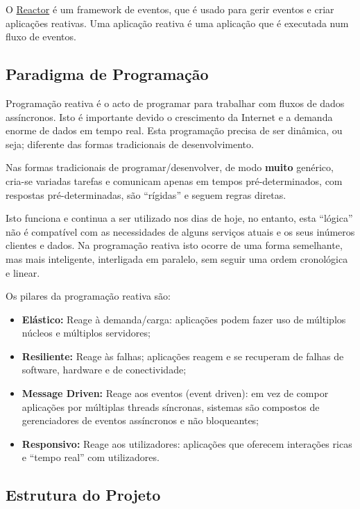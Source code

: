 O \href{https://projectreactor.io/}{Reactor} é um framework de eventos, que é usado para gerir eventos e criar aplicações reativas. Uma aplicação reativa é uma aplicação que é executada num fluxo de eventos.\cite{reactor}

\subsection{Paradigma de Programação}

Programação reativa é o acto de programar para trabalhar com fluxos de dados assíncronos. Isto é importante devido o crescimento da Internet e a demanda enorme de dados em tempo real. Esta programação precisa de ser dinâmica, ou seja; diferente das formas tradicionais de desenvolvimento.\cite{reactive}

\newpage

Nas formas tradicionais de programar/desenvolver, de modo \textbf{muito} genérico, cria-se variadas tarefas e comunicam apenas em tempos pré-determinados, com respostas pré-determinadas, são ``rígidas'' e seguem regras diretas.

Isto funciona e continua a ser utilizado nos dias de hoje, no entanto, esta ``lógica'' não é compatível com as necessidades de alguns serviços atuais e os seus inúmeros clientes e dados. Na programação reativa isto ocorre de uma forma semelhante, mas mais inteligente, interligada em paralelo, sem seguir uma ordem cronológica e linear.

Os pilares da programação reativa são:

\begin{itemize}
  \item \textbf{Elástico:} Reage à demanda/carga: aplicações podem fazer uso de múltiplos núcleos e múltiplos servidores;
  \item \textbf{Resiliente:} Reage às falhas; aplicações reagem e se recuperam de
    falhas de software, hardware e de conectividade;
  \item \textbf{Message Driven:} Reage aos eventos (event driven): em vez de compor
    aplicações por múltiplas threads síncronas, sistemas são compostos de gerenciadores de eventos assíncronos e não bloqueantes;
  \item \textbf{Responsivo:} Reage aos utilizadores: aplicações que oferecem interações
    ricas e ``tempo real'' com utilizadores.
\end{itemize}

\subsection{Estrutura do Projeto}

